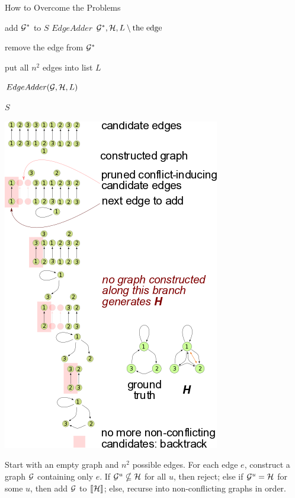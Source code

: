 \documentclass[final,hyperref={pdfpagelabels=false}]{beamer}
\begin{document}
\begin{frame}{}
\begin{columns}[t]
\begin{column}{.48\linewidth}
\begin{block}{\Large How to Overcome the Problems}
\begin{minipage}{0.5\textwidth}
{{{{{                    
                    { 
                      add ${\cal G}^*$ to $S$
                    }
                    $EdgeAdder$ ${\cal G}^*, {\cal H},
                    L\setminus\text{the edge}$

                    remove the edge from ${\cal G}^*$
                  }
                }
                
              }
            }

            \BlankLine
            put all $n^2$ edges into list $L$

            $EdgeAdder({\cal G},{\cal H}, L)$

            \Return $S$
          }
        \end{minipage} %
        \begin{minipage}{0.4\textwidth}
          \centerline{\includegraphics{recursive_tree}}
        \end{minipage}



        \begin{minipage}{.9\textwidth}
        \vspace{5 mm}
          Start with an empty graph and $n^2$  possible edges. For each edge $e$, construct a graph ${\cal G}$ containing only $e$. If ${\cal G}^{u} \nsubseteq {\cal  H}$  for all $u$, then reject; else if ${\cal G}^{u} = {\cal  H}$ for some $u$, then add ${\cal G}$ to $\llbracket{\cal H}\rrbracket$; else, recurse into non-conflicting graphs in order.
        \end{minipage}%
        \end{block}
  

\end{column}
\end{columns}
\end{frame}
\end{document}
